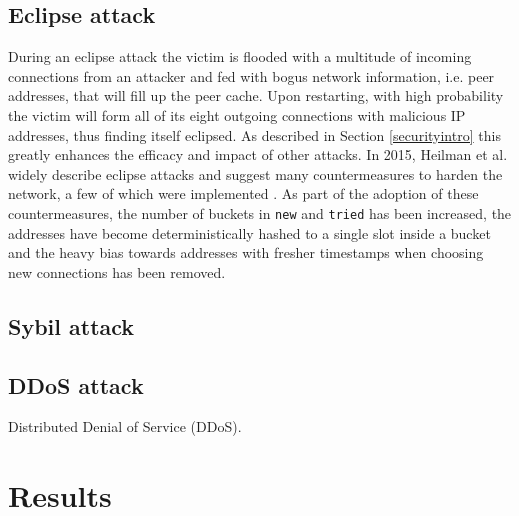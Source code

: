 \documentclass[12pt, letterpaper, twoside]{article}
\begin{document}
\subsection{Eclipse attack}\label{eclipse}
During an eclipse attack the victim is flooded with a multitude of incoming connections from an attacker and fed with bogus network information, i.e. peer addresses, that will fill up the peer cache. Upon restarting, with high probability the victim will form all of its eight outgoing connections with malicious IP addresses, thus finding itself eclipsed. As described in Section \ref{securityintro} this greatly enhances the efficacy and impact of other attacks. In 2015, Heilman et al. widely describe eclipse attacks and suggest many countermeasures to harden the network, a few of which were implemented \cite{eclipseatk}. As part of the adoption of these countermeasures, the number of buckets in \texttt{new} and \texttt{tried} has been increased, the addresses have become deterministically hashed to a single slot inside a bucket and the heavy bias towards addresses with fresher timestamps when choosing new connections has been removed.

\subsection{Sybil attack}\label{sybil}

\subsection{DDoS attack}\label{ddos}
Distributed Denial of Service (DDoS).

\section{Results}\label{res}




















\end{document}
